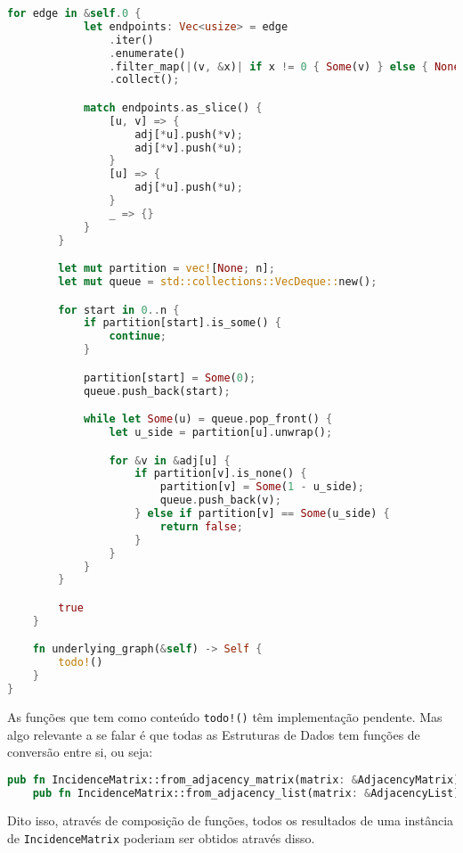 \begin{lstlisting}[language=Rust, caption={Implementação de Graph na Estrutura de Dados Matriz de Incidência}, label=list:impl_inc_mat_g]
        for edge in &self.0 {
            let endpoints: Vec<usize> = edge
                .iter()
                .enumerate()
                .filter_map(|(v, &x)| if x != 0 { Some(v) } else { None })
                .collect();

            match endpoints.as_slice() {
                [u, v] => {
                    adj[*u].push(*v);
                    adj[*v].push(*u);
                }
                [u] => {
                    adj[*u].push(*u);
                }
                _ => {}
            }
        }

        let mut partition = vec![None; n];
        let mut queue = std::collections::VecDeque::new();

        for start in 0..n {
            if partition[start].is_some() {
                continue;
            }

            partition[start] = Some(0);
            queue.push_back(start);

            while let Some(u) = queue.pop_front() {
                let u_side = partition[u].unwrap();

                for &v in &adj[u] {
                    if partition[v].is_none() {
                        partition[v] = Some(1 - u_side);
                        queue.push_back(v);
                    } else if partition[v] == Some(u_side) {
                        return false;
                    }
                }
            }
        }

        true
    }

    fn underlying_graph(&self) -> Self {
        todo!()
    }
}
\end{lstlisting}

As funções que tem como conteúdo \texttt{todo!()} têm implementação pendente. Mas algo relevante a se falar é que todas as Estruturas de Dados tem funções de conversão entre si, ou seja:

\begin{lstlisting}[language=Rust, caption={Funções de Conversão}, label=list:convesion]
    pub fn IncidenceMatrix::from_adjacency_matrix(matrix: &AdjacencyMatrix) -> Self;
    pub fn IncidenceMatrix::from_adjacency_list(matrix: &AdjacencyList) -> Self;
\end{lstlisting}

Dito isso, através de composição de funções, todos os resultados de uma instância de \texttt{IncidenceMatrix} poderiam ser obtidos através disso.
